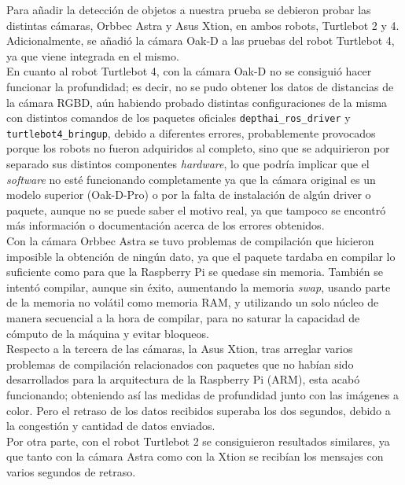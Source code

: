 Para añadir la detección de objetos a nuestra prueba se debieron probar las
distintas cámaras, Orbbec Astra y Asus Xtion, en ambos robots, Turtlebot 2 y 4.
Adicionalmente, se añadió la cámara Oak-D a las pruebas del robot Turtlebot 4,
ya que viene integrada en el mismo.
\\

En cuanto al robot Turtlebot 4, con la cámara Oak-D no se consiguió hacer
funcionar la profundidad; es decir, no se pudo obtener los datos de distancias
de la cámara RGBD, aún habiendo probado distintas configuraciones de la misma
con distintos comandos de los paquetes oficiales \texttt{depthai\_ros\_driver} y
\texttt{turtlebot4\_bringup}, debido a diferentes errores, probablemente
provocados porque los robots no fueron adquiridos al completo, sino que se
adquirieron por separado sus distintos componentes \textit{hardware}, lo que
podría implicar que el \textit{software} no esté funcionando completamente ya
que la cámara original es un modelo superior (Oak-D-Pro) o por la falta de
instalación de algún driver o paquete, aunque no se puede saber el motivo real,
ya que tampoco se encontró más información o documentación acerca de los errores
obtenidos.
\\

Con la cámara Orbbec Astra se tuvo problemas de compilación que hicieron
imposible la obtención de ningún dato, ya que el paquete tardaba en compilar lo
suficiente como para que la Raspberry Pi se quedase sin memoria.
También se intentó compilar, aunque sin éxito, aumentando la memoria
\textit{swap}, usando parte de la memoria no volátil como memoria RAM, y
utilizando un solo núcleo de manera secuencial a la hora de compilar, para no
saturar la capacidad de cómputo de la máquina y evitar bloqueos.
\\

Respecto a la tercera de las cámaras, la Asus Xtion, tras arreglar varios
problemas de compilación relacionados con paquetes que no habían sido
desarrollados para la arquitectura de la Raspberry Pi (ARM), esta acabó
funcionando; obteniendo así las medidas de profundidad junto con las imágenes a
color.
Pero el retraso de los datos recibidos superaba los dos segundos, debido a la
congestión y cantidad de datos enviados.
\\

Por otra parte, con el robot Turtlebot 2 se consiguieron resultados similares,
ya que tanto con la cámara Astra como con la Xtion se recibían los mensajes con
varios segundos de retraso.
\\

